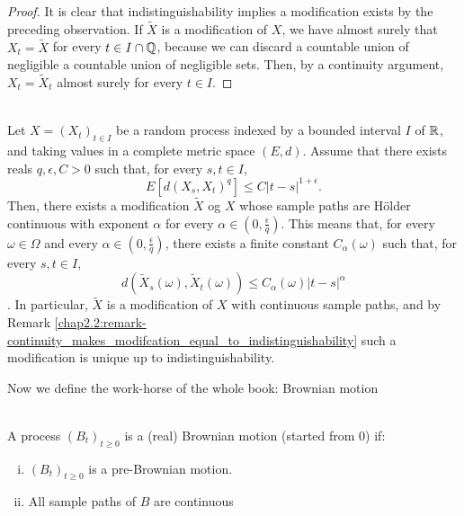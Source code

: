 \begin{proof}
It is clear that indistinguishability implies a modification exists by the preceding observation.
If $\tilde{X}$ is a modification of $X$, we have almost surely that $X_t = \tilde{X}$ for every $t \in I \cap \mathbb{Q}$, because we can discard a countable union of negligible a countable union of negligible sets. Then, by a continuity argument, $X_t=\tilde{X}_t$ almost surely for every $t \in I$.
\end{proof}

\begin{theorem} \label{chap2.2:theorem-kolmogorovs_continuity_criterion}
 \\
Let $X=(X_t)_{t \in I}$ be a random process indexed by a bounded interval $I$ of $\mathbb{R}$, and taking values in a complete metric space $(E,d)$. Assume that there exists reals $q, \epsilon, C >0$ such that, for every $s,t \in I$,
\begin{equation}\label{chap2.2:equation-kolmogorovs_continuity_criterion}
E[d(X_s,X_t)^q] \leq C|t-s|^{1+\epsilon}.    
\end{equation}
Then, there exists a modification $\tilde{X}$ og $X$ whose sample paths are Hölder continuous with exponent $\alpha$ for every $\alpha \in (0, \frac{\epsilon}{q})$. This means that, for every $\omega \in \Omega$ and every $\alpha \in (0,\frac{\epsilon}{q})$, there exists a finite constant $C_\alpha(\omega)$ such that, for every $s,t \in I$,
$$d(\tilde{X}_s(\omega), \tilde{X}_t(\omega)) \leq C_\alpha(\omega)|t-s|^{\alpha}$$.
In particular, $\tilde{X}$ is a modification of $X$ with continuous sample paths, and by Remark \ref{chap2.2:remark-continuity_makes_modifcation_equal_to_indistinguishability} such a modification is unique up to indistinguishability.
\end{theorem}


Now we define the work-horse of the whole book: Brownian motion
\begin{definition}\label{chap2.2:definition-brownian_motion}
 \\
A process $(B_t)_{t \geq0}$ is a (real) Brownian motion (started from 0) if:
\begin{enumerate}[(i)]
    \item $(B_t)_{t \geq 0}$ is a pre-Brownian motion.
    \item All sample paths of $B$ are continuous
\end{enumerate}
\end{definition}

